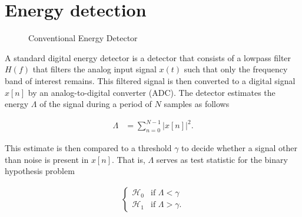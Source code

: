 \documentclass[a4paper, openany, oneside]{memoir}
\begin{document}
\section{Energy detection}

\begin{figure}[H]
\centering
{}
\caption{Conventional Energy Detector}\label{tkz:conv_ed}
\end{figure}

A standard digital energy detector is a detector that consists of a lowpass filter $H(f)$ that filters the analog input signal $x(t)$ such
that only the frequency band of interest remains. This filtered signal is then converted to a digital signal $x[n]$ by an analog-to-digital converter (ADC). The detector estimates the energy $\Lambda$ of the signal during a period of $N$ samples as follows

\begin{align}\label{eq:test_ed}
	\Lambda &= \sum_{n=0}^{N-1} |x[n]|^2.
\end{align}

This estimate is then compared to a threshold $\gamma$ to decide whether a signal other than noise is present in $x[n]$. That is, $\Lambda$ serves as test statistic for the binary hypothesis problem

\begin{align*}
	\begin{cases}
		\mathcal{H}_0 & \text{if } \Lambda < \gamma \\
		\mathcal{H}_1 & \text{if } \Lambda > \gamma.
	\end{cases}
\end{align*}
 
\end{document}
